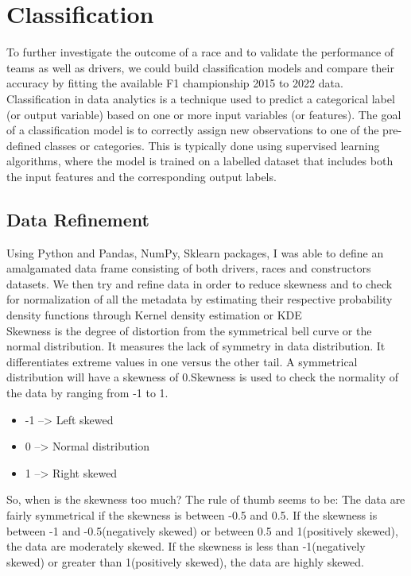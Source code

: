 \documentclass[10pt,twocolumn,letterpaper]{article}
\begin{document}
\section{Classification}

To further investigate the outcome of a race and to validate the performance of teams as well as drivers, we could build classification models and compare their accuracy by fitting the available F1 championship 2015 to 2022 data. Classification in data analytics is a technique used to predict a categorical label (or output variable) based on one or more input variables (or features). The goal of a classification model is to correctly assign new observations to one of the pre-defined classes or categories. This is typically done using supervised learning algorithms, where the model is trained on a labelled dataset that includes both the input features and the corresponding output labels. 

\subsection{Data Refinement}

Using Python and Pandas, NumPy, Sklearn packages, I was able to define an amalgamated data frame consisting of both drivers, races and constructors datasets. We then try and refine data in order to reduce skewness and to check for normalization of all the metadata by estimating their respective probability density functions through Kernel density estimation or KDE \\

Skewness is the degree of distortion from the symmetrical bell curve or the normal distribution. It measures the lack of symmetry in data distribution. It differentiates extreme values in one versus the other tail. A symmetrical distribution will have a skewness of 0.Skewness is used to check the normality of the data by ranging from -1 to 1.

\begin{itemize}
    \item-1 --> Left skewed
    \item0 --> Normal distribution
    \item1 --> Right skewed
\end{itemize}

So, when is the skewness too much? The rule of thumb seems to be:
The data are fairly symmetrical if the skewness is between -0.5 and 0.5.
If the skewness is between -1 and -0.5(negatively skewed) or between 0.5 and 1(positively skewed), the data are moderately skewed.
If the skewness is less than -1(negatively skewed) or greater than 1(positively skewed), the data are highly skewed. \\
\end{document}
